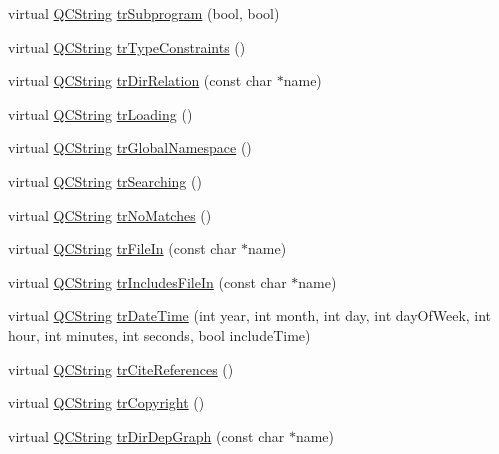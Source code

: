 \begin{DoxyCompactItemize}
virtual \hyperlink{class_q_c_string}{Q\-C\-String} \hyperlink{class_translator_chinesetraditional_a9f1bd15801b5d9d28b6030f00da54ee5}{tr\-Subprogram} (bool, bool)
\item 
virtual \hyperlink{class_q_c_string}{Q\-C\-String} \hyperlink{class_translator_chinesetraditional_a196f3eb690f2748ee71f518cf02bd7fe}{tr\-Type\-Constraints} ()
\item 
virtual \hyperlink{class_q_c_string}{Q\-C\-String} \hyperlink{class_translator_chinesetraditional_a38a56cc8bcc5323be9d1f09b0daa5933}{tr\-Dir\-Relation} (const char $\ast$name)
\item 
virtual \hyperlink{class_q_c_string}{Q\-C\-String} \hyperlink{class_translator_chinesetraditional_aca8cf7409bceb9f8e6af47f637da5457}{tr\-Loading} ()
\item 
virtual \hyperlink{class_q_c_string}{Q\-C\-String} \hyperlink{class_translator_chinesetraditional_aa9fd39641e570165be20c71c67481fee}{tr\-Global\-Namespace} ()
\item 
virtual \hyperlink{class_q_c_string}{Q\-C\-String} \hyperlink{class_translator_chinesetraditional_aea79f5912e787bbb2c441223ccd382c6}{tr\-Searching} ()
\item 
virtual \hyperlink{class_q_c_string}{Q\-C\-String} \hyperlink{class_translator_chinesetraditional_a240e49b617153456e0f29bef561cc10f}{tr\-No\-Matches} ()
\item 
virtual \hyperlink{class_q_c_string}{Q\-C\-String} \hyperlink{class_translator_chinesetraditional_acf964d17bad4c55c393193fe9708575f}{tr\-File\-In} (const char $\ast$name)
\item 
virtual \hyperlink{class_q_c_string}{Q\-C\-String} \hyperlink{class_translator_chinesetraditional_a53f57c6e2aa0b9dc09bc47b3746d3481}{tr\-Includes\-File\-In} (const char $\ast$name)
\item 
virtual \hyperlink{class_q_c_string}{Q\-C\-String} \hyperlink{class_translator_chinesetraditional_a19c43671f677ae0445fca1fe7a5f62cc}{tr\-Date\-Time} (int year, int month, int day, int day\-Of\-Week, int hour, int minutes, int seconds, bool include\-Time)
\item 
virtual \hyperlink{class_q_c_string}{Q\-C\-String} \hyperlink{class_translator_chinesetraditional_ae43b2c6dbb1637144e32cd13a0d4704c}{tr\-Cite\-References} ()
\item 
virtual \hyperlink{class_q_c_string}{Q\-C\-String} \hyperlink{class_translator_chinesetraditional_a840474c30dfc2d4e92d1a29c5d1bf343}{tr\-Copyright} ()
\item 
virtual \hyperlink{class_q_c_string}{Q\-C\-String} \hyperlink{class_translator_chinesetraditional_abbe522be6eed72f54409458a1896323c}{tr\-Dir\-Dep\-Graph} (const char $\ast$name)

\end{DoxyCompactItemize}
